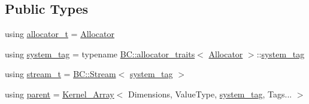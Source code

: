 \subsection*{Public Types}
\begin{DoxyCompactItemize}
\item 
using \hyperlink{classBC_1_1tensors_1_1exprs_1_1Array__Slice_aa0bee33cbbb4ea522d89aefa986b6584}{allocator\+\_\+t} = \hyperlink{namespaceBC_a934f94b17b06290e6b241e5f59930c5f}{Allocator}
\item 
using \hyperlink{classBC_1_1tensors_1_1exprs_1_1Array__Slice_ae9aed80988883e25cc77cdd0e658a36e}{system\+\_\+tag} = typename \hyperlink{namespaceBC_a702bcffa3526460ac93fb2a315f2f7c7}{B\+C\+::allocator\+\_\+traits}$<$ \hyperlink{namespaceBC_a934f94b17b06290e6b241e5f59930c5f}{Allocator} $>$\+::\hyperlink{classBC_1_1tensors_1_1exprs_1_1Array__Slice_ae9aed80988883e25cc77cdd0e658a36e}{system\+\_\+tag}
\item 
using \hyperlink{classBC_1_1tensors_1_1exprs_1_1Array__Slice_a5395d730cd39e49ff6695a3294b4be5f}{stream\+\_\+t} = \hyperlink{namespaceBC_abc64a63cd29a22d102a68f478dfd588d}{B\+C\+::\+Stream}$<$ \hyperlink{classBC_1_1tensors_1_1exprs_1_1Array__Slice_ae9aed80988883e25cc77cdd0e658a36e}{system\+\_\+tag} $>$
\item 
using \hyperlink{classBC_1_1tensors_1_1exprs_1_1Array__Slice_acabef76354e22bb269d63cec2cd501df}{parent} = \hyperlink{structBC_1_1tensors_1_1exprs_1_1Kernel__Array}{Kernel\+\_\+\+Array}$<$ Dimensions, Value\+Type, \hyperlink{classBC_1_1tensors_1_1exprs_1_1Array__Slice_ae9aed80988883e25cc77cdd0e658a36e}{system\+\_\+tag}, Tags... $>$
\end{DoxyCompactItemize}
